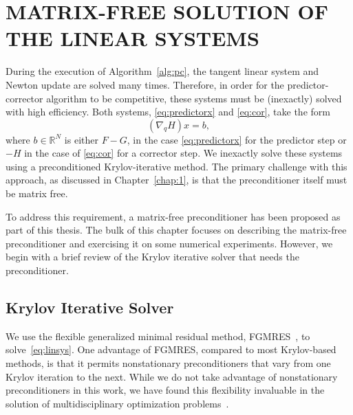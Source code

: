  
\chapter{MATRIX-FREE SOLUTION OF THE LINEAR SYSTEMS}\label{chap:linsys}
During the execution of Algorithm~\ref{alg:pc}, the tangent linear system and
Newton update are solved many times.  Therefore, in order for the
predictor-corrector algorithm to be competitive, these systems must be
(inexactly) solved with high efficiency.  Both systems, \eqref{eq:predictorx}
and \eqref{eq:cor}, take the form
\begin{equation}\label{eq:linsys}
  (\nabla_q H) x = b,
\end{equation}
where $b \in
\mathbb{R}^{N}$ is either $F - G$, in the case \eqref{eq:predictorx} for the predictor step or $-H$ in the case of \eqref{eq:cor} for a corrector step.  We inexactly solve these systems using a preconditioned
Krylov-iterative method.  The primary challenge with this approach, as discussed
in Chapter~\ref{chap:1}, is that the preconditioner itself must be matrix free.

To address this requirement, a matrix-free preconditioner has been proposed as part of this thesis. 
The bulk of this chapter focuses on describing the matrix-free preconditioner and exercising it on some numerical experiments.  However, we begin with a brief review of the Krylov iterative solver that needs the preconditioner.

\section{Krylov Iterative Solver}\label{2:krylov}
We use the flexible generalized minimal residual method,
FGMRES~\cite{Saad1993fgmres}, to solve~\eqref{eq:linsys}.  One advantage of
FGMRES, compared to most Krylov-based methods, is that it permits nonstationary
preconditioners that vary from one Krylov iteration to the next.  While we do
not take advantage of nonstationary preconditioners in this work, we have found
this flexibility invaluable in the solution of multidisciplinary optimization
problems~\cite{dener:idf2017, dener:2014}.

